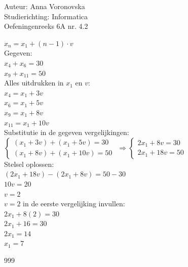 \documentclass[a4paper]{article}
\begin{document}
  
\noindent \large Auteur: Anna Voronovska \\
\noindent \large Studierichting: Informatica\\
\noindent \large Oefeningenreeks 6A nr. 4.2\\

\medskip

\normalsize

$x_n = x_1 + (n - 1) \cdot v$\\

Gegeven:\\

$x_4 + x_6 = 30$ \\

$x_9 + x_{11} = 50$\\

Alles uitdrukken in $x_1$ en $v$:\\

$x_4 = x_1 + 3v$\\

$x_6 = x_1 + 5v$\\

$x_9 = x_1 + 8v$\\

$x_{11} = x_1 + 10v$\\

Substitutie in de gegeven vergelijkingen:\\

$\left\{ \begin{array}{l}
    (x_1 + 3v) + (x_1 + 5v) = 30 \\
    (x_1 + 8v) + (x_1 + 10v) = 50
\end{array} \right.
$
$\Rightarrow
\left\{ \begin{array}{l}
    2x_1 + 8v = 30 \\
    2x_1 + 18v = 50
\end{array} \right.
$\\

Stelsel oplossen:\\

$(2x_1 + 18v) - (2x_1 + 8v) = 50 - 30 $\\

$10v = 20$\\

$v = 2$\\

$v = 2$ in de eerste vergelijking invullen:\\

$2x_1 + 8(2) = 30 $\\

$2x_1 + 16 = 30$ \\

$2x_1 = 14$\\

$x_1 = 7$

\begin{thebibliography}{999}
\end{thebibliography}
\end{document}
